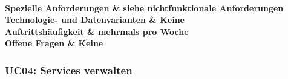 \documentclass[11pt]{scrartcl}
\begin{document}
\begin{longtabu}
\begin{enumerate}
      \end{enumerate}
      
      \\\hline
	\bfseries Spezielle Anforderungen & siehe nichtfunktionale Anforderungen  \\\hline 
	\bfseries Technologie- und Datenvarianten & Keine  \\\hline 
	\bfseries Auftrittshäufigkeit & mehrmals pro Woche  \\\hline 
	\bfseries Offene Fragen & Keine  \\\hline  
\end{longtabu}
\subsubsection{UC04: Services verwalten}
\end{document}
